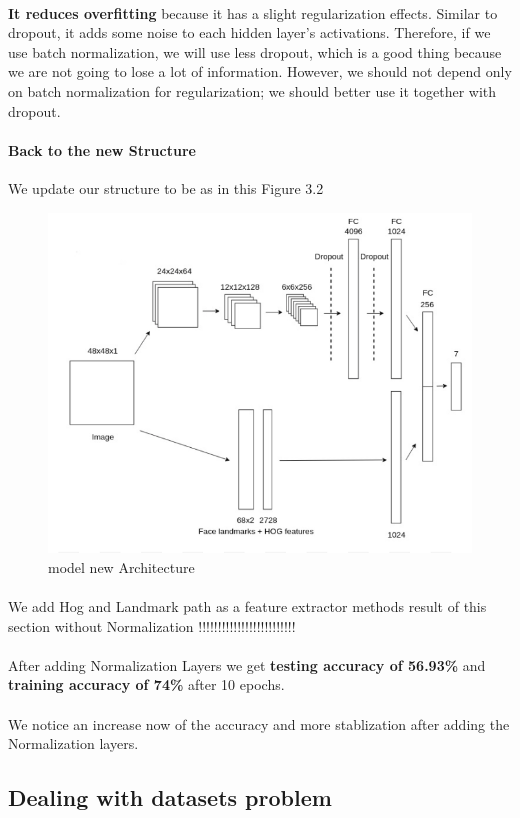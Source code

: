 \paragraph{}
\textbf{It reduces overfitting}
because it has a slight regularization effects. Similar to dropout, it adds some noise to each hidden layer’s activations. Therefore, if we use batch normalization, we will use less dropout, which is a good thing because we are not going to lose a lot of information. However, we should not depend only on batch normalization for regularization; we should better use it together with dropout.
\paragraph{Back to the new Structure}
We update our structure to be as in this Figure 3.2
\begin{figure}
	\centering
	\includegraphics[width=.5\textwidth]{Arch.png}
	\caption{model new Architecture}
\end{figure} 
\paragraph{}
We add Hog and Landmark path as a feature extractor methods 
result of this section without Normalization
!!!!!!!!!!!!!!!!!!!!!!!!!
\paragraph{}
After adding Normalization Layers we get \textbf{testing accuracy of 56.93\%} and \textbf{training accuracy of 74\%} after 10 epochs. 
\paragraph{}
We notice an increase now of the accuracy and more stablization after adding the Normalization layers.

\subsection{Dealing with datasets problem}
